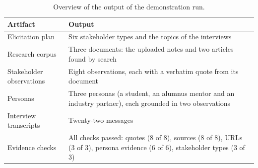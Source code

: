 \begin{table}[H]
    \centering
    \caption{Overview of the output of the demonstration run.}
    \label{tab:impl-demo-output}
    \begin{tabularx}{\linewidth}{|l|X|}
        \hline
        \textbf{Artifact} & \textbf{Output} \\
        \hline
        Elicitation plan & Six stakeholder types and the topics of the interviews \\
        Research corpus & Three documents: the uploaded notes and two articles found by search \\
        Stakeholder observations & Eight observations, each with a verbatim quote from its document \\
        Personas & Three personas (a student, an alumnus mentor and an industry partner), each grounded in two observations \\
        Interview transcripts & Twenty-two messages \\
        Evidence checks & All checks passed: quotes (8 of 8), sources (8 of 8), URLs (3 of 3), persona evidence (6 of 6), stakeholder types (3 of 3) \\
        \hline
    \end{tabularx}
\end{table}

